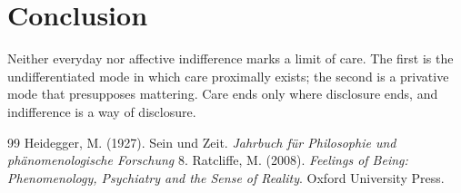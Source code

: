 \documentclass{situationist-preprint}
\begin{document}
\section{Conclusion}

Neither everyday nor affective indifference marks a limit of care. The first is the undifferentiated mode in which care proximally exists; the second is a privative mode that presupposes mattering. Care ends only where disclosure ends, and indifference is a way of disclosure.

\begin{thebibliography}{99}\small
{} Heidegger, M. (1927). Sein und Zeit. \emph{Jahrbuch für Philosophie und phänomenologische Forschung} 8.
 Ratcliffe, M. (2008). \emph{Feelings of Being: Phenomenology, Psychiatry and the Sense of Reality}. Oxford University Press.
\end{thebibliography}
\end{document}
